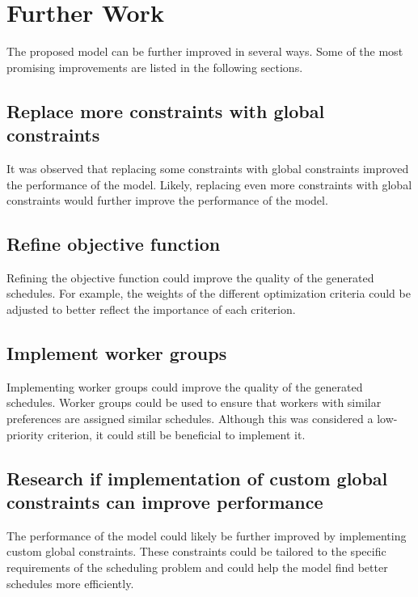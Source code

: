 \documentclass[conference]{IEEEtran}
\begin{document}
\section{Further Work}
\label{section:further-work}

The proposed model can be further improved in several ways. Some of the most promising improvements are listed in the following sections.

\subsection*{Replace more constraints with global constraints}

It was observed that replacing some constraints with global constraints improved the performance of the model. Likely, replacing even more constraints with global constraints would further improve the performance of the model.

\subsection*{Refine objective function}

Refining the objective function could improve the quality of the generated schedules. For example, the weights of the different optimization criteria could be adjusted to better reflect the importance of each criterion.

\subsection*{Implement worker groups}

Implementing worker groups could improve the quality of the generated schedules. Worker groups could be used to ensure that workers with similar preferences are assigned similar schedules. Although this was considered a low-priority criterion, it could still be beneficial to implement it.

\subsection*{Research if implementation of custom global constraints can improve performance}

The performance of the model could likely be further improved by implementing custom global constraints. These constraints could be tailored to the specific requirements of the scheduling problem and could help the model find better schedules more efficiently.
\end{document}
